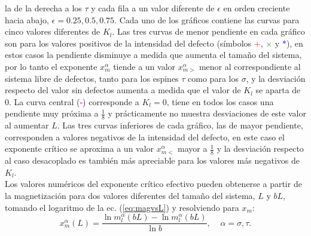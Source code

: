  la de la derecha a los $\tau$ y cada fila a un valor diferente de $\epsilon$ en orden creciente hacia abajo,
 $\epsilon=0.25,0.5,0.75$. Cada uno de los gr\'aficos contiene las curvas para cinco valores diferentes de $K_{l}$.
 Las tres curvas de menor pendiente en cada gr\'afico son para los valores  positivos de la intensidad del defecto
 (s\'imbolos \textcolor{red}{$+$}, \textcolor{green}{$\times$} y \textcolor{blue}{$*$}), en estos casos la
 pendiente disminuye a medida que aumenta el tamaño del sistema, por lo tanto el exponente
 $x_{m}^{\alpha}$ tiende a un valor $x_{m>}^{\alpha}$ menor al correspondiente al sistema libre de defectos, tanto para los espines
 $\tau$ como para los $\sigma$, y la desviación respecto del valor sin defectos aumenta a medida que el valor de $K_{l}$ se aparta de $0$.
La curva central (\textcolor{magenta}{$\square$}) corresponde a $K_{l}=0$, tiene en todos los casos una pendiente muy pr\'oxima
 a $\frac{1}{8}$ y pr\'acticamente no muestra desviaciones de este valor al aumentar $L$.
Las tres curvas inferiores de cada gr\'afico, las de mayor pendiente, corresponden a valores negativos de la intensidad del defecto,
 en este caso el exponente crítico se aproxima a un valor $x_{m<}^{\alpha}$ mayor a $\frac{1}{8}$ y la desviación respecto al caso desacoplado
 es también más apreciable para los valores más negativos de $K_{l}$.\\

Los valores num\'ericos del exponente cr\'itico efectivo pueden obtenerse a partir de la magnetización para dos
 valores diferentes del tamaño del sistema, $L$ y $bL$, tomando el logaritmo de la ec. (\ref{eq:magvsL}) y resolviendo para $x_{m}$:
\begin{equation}
	\label{eq:exp_eff}
	x_{m}^{\alpha}(L) = \frac{\ln{m_{l}^{\alpha}(bL)}-\ln{m_{l}^{\alpha}(bL)}}{\ln{b}}, \; \; \; \; \alpha=\sigma , \tau .
\end{equation}

